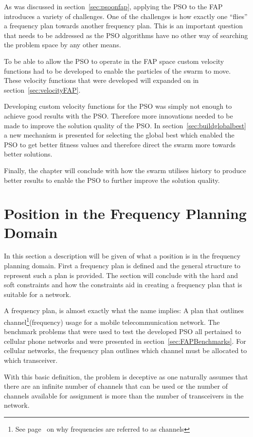 As was discussed in section~\ref{sec:psoonfap}, applying the PSO to the FAP introduces a variety of challenges. One of the challenges is how exactly one ``flies'' a frequency plan towards another frequency plan. This is an important question that needs to be addressed as the PSO algorithms have no other way of searching the problem space by any other means.

To be able to allow the PSO to operate in the FAP space custom velocity functions had to be developed to enable the particles of the swarm to move. These velocity functions that were developed will expanded on in section~\ref{sec:velocityFAP}. 

Developing custom velocity functions for the PSO was simply not enough to achieve good results with the PSO. Therefore more innovations needed to be made to improve the solution quality of the PSO. In section~\ref{sec:buildglobalbest} a new mechanism is presented for selecting the global best which enabled the PSO to get better fitness values and therefore direct the swarm more towards better solutions. 

Finally, the chapter will conclude with how the swarm utilises history to produce better results to enable the PSO to further improve the solution quality.
\section{Position in the Frequency Planning Domain}
In this section a description will be given of what a position is in the frequency planning domain. First a frequency plan is defined and the general structure to represent such a plan is provided. The section will conclude with the hard and soft constraints and how the constraints aid in creating a frequency plan that is suitable for a network.

A frequency plan, is almost exactly what the name implies: A plan that outlines channel\footnote{See page~\pageref{def:channel} on why frequencies are referred to as channels}(frequency) usage for a mobile telecommunication network. The benchmark problems that were used to test the developed PSO all pertained to cellular phone networks and were presented in section~\ref{sec:FAPBenchmarks}. For cellular networks, the frequency plan outlines which channel must be allocated to which transceiver.

With this basic definition, the problem is deceptive as one naturally assumes that there are an infinite number of channels that can be used or the number of channels available for assignment is more than the number of transceivers in the network. 

